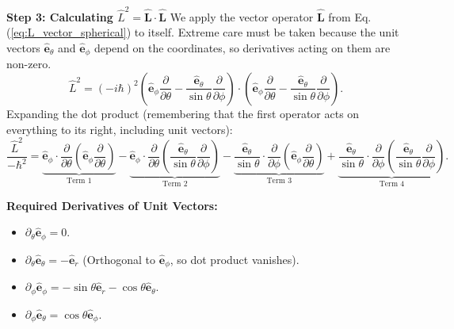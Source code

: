 \textbf{Step 3: Calculating $\hat{L}^2 = \hat{\mathbf{L}} \cdot \hat{\mathbf{L}}$}
We apply the vector operator $\hat{\mathbf{L}}$ from Eq. (\ref{eq:L_vector_spherical}) to itself. Extreme care must be taken because the unit vectors $\hat{\mathbf{e}}_\theta$ and $\hat{\mathbf{e}}_\phi$ depend on the coordinates, so derivatives acting on them are non-zero.
\begin{equation}
    \hat{L}^2 = (-i\hbar)^2 \left( \hat{\mathbf{e}}_\phi \frac{\partial}{\partial \theta} - \frac{\hat{\mathbf{e}}_\theta}{\sin\theta} \frac{\partial}{\partial \phi} \right) \cdot \left( \hat{\mathbf{e}}_\phi \frac{\partial}{\partial \theta} - \frac{\hat{\mathbf{e}}_\theta}{\sin\theta} \frac{\partial}{\partial \phi} \right).
\end{equation}
Expanding the dot product (remembering that the first operator acts on everything to its right, including unit vectors):
\begin{equation}
    \frac{\hat{L}^2}{-\hbar^2} = \underbrace{\hat{\mathbf{e}}_\phi \cdot \frac{\partial}{\partial \theta} \left( \hat{\mathbf{e}}_\phi \frac{\partial}{\partial \theta} \right)}_{\text{Term 1}} 
    - \underbrace{\hat{\mathbf{e}}_\phi \cdot \frac{\partial}{\partial \theta} \left( \frac{\hat{\mathbf{e}}_\theta}{\sin\theta} \frac{\partial}{\partial \phi} \right)}_{\text{Term 2}} 
    - \underbrace{\frac{\hat{\mathbf{e}}_\theta}{\sin\theta} \cdot \frac{\partial}{\partial \phi} \left( \hat{\mathbf{e}}_\phi \frac{\partial}{\partial \theta} \right)}_{\text{Term 3}} 
    + \underbrace{\frac{\hat{\mathbf{e}}_\theta}{\sin\theta} \cdot \frac{\partial}{\partial \phi} \left( \frac{\hat{\mathbf{e}}_\theta}{\sin\theta} \frac{\partial}{\partial \phi} \right)}_{\text{Term 4}}.
\end{equation}

\textbf{Required Derivatives of Unit Vectors:}
\begin{itemize}
    \item $\partial_\theta \hat{\mathbf{e}}_\phi = 0$.
    \item $\partial_\theta \hat{\mathbf{e}}_\theta = -\hat{\mathbf{e}}_r$ (Orthogonal to $\hat{\mathbf{e}}_\phi$, so dot product vanishes).
    \item $\partial_\phi \hat{\mathbf{e}}_\phi = -\sin\theta \hat{\mathbf{e}}_r - \cos\theta \hat{\mathbf{e}}_\theta$.
    \item $\partial_\phi \hat{\mathbf{e}}_\theta = \cos\theta \hat{\mathbf{e}}_\phi$.
\end{itemize}

